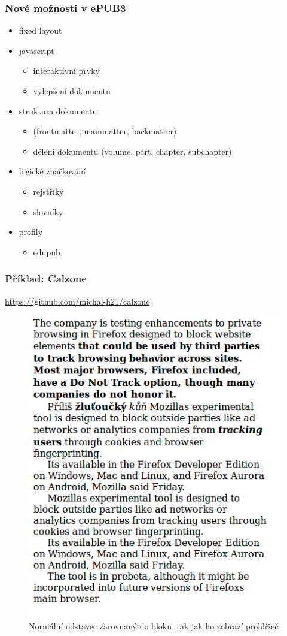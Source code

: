 \documentclass[czech]{beamer}
\begin{document}
\begin{frame}
  \frametitle{Nové možnosti v ePUB3}
  \begin{itemize}%
    \item fixed layout
    \item  javascript
      \begin{itemize}
        \item  interaktivní prvky
        \item vylepšení dokumentu
      \end{itemize}
    \item  struktura dokumentu
      \begin{itemize}
        \item  (frontmatter, mainmatter, backmatter)
        \item  dělení dokumentu (volume, part, chapter, subchapter)
      \end{itemize}
    \item logické značkování
      \begin{itemize}
        \item rejstříky
        \item slovníky
      \end{itemize}
     \item profily
       \begin{itemize}
     \item edupub
   \end{itemize}
\end{itemize}
\end{frame}
\begin{frame}
        \frametitle{Příklad: Calzone }
\url{https://github.com/michal-h21/calzone}
\begin{figure}
  \includegraphics[width=.6\textwidth]{examples/without-calzone.png}
  \caption{Normální odstavec zarovnaný do bloku, tak jak ho zobrazí prohlížeč}
\end{figure}
\end{frame}
\end{document}
